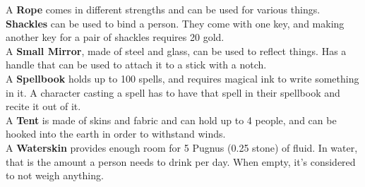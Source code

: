 A \textbf{Rope} comes in different strengths and can be used for various things.\\

\textbf{Shackles} can be used to bind a person. They come with one key, and making another key for a pair of shackles requires 20 gold.\\

A \textbf{Small Mirror}, made of steel and glass, can be used to reflect things. Has a handle that can be used to attach it to a stick with a notch.\\

A \textbf{Spellbook} holds up to 100 spells, and requires magical ink to write something in it. A character casting a spell has to have that spell in their spellbook and recite it out of it.\\

A \textbf{Tent} is made of skins and fabric and can hold up to 4 people, and can be hooked into the earth in order to withstand winds.\\

A \textbf{Waterskin} provides enough room for 5 Pugnus (0.25 stone) of fluid. In water, that is the amount a person needs to drink per day. When empty, it's considered to not weigh anything.\\